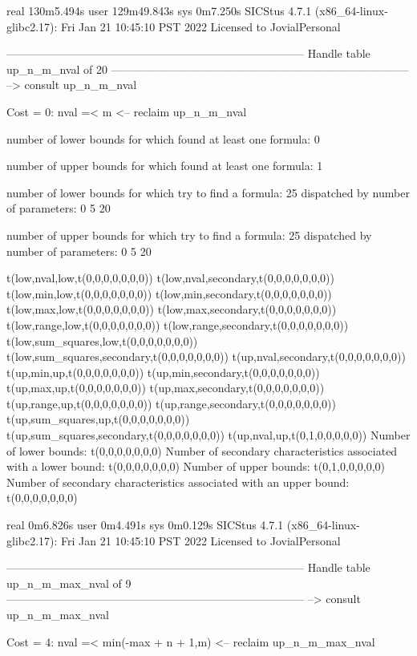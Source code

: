 real	130m5.494s
user	129m49.843s
sys	0m7.250s
SICStus 4.7.1 (x86_64-linux-glibc2.17): Fri Jan 21 10:45:10 PST 2022
Licensed to JovialPersonal


--------------------------------------------------------------------------------
Handle table up_n_m_nval of 20
--------------------------------------------------------------------------------
--> consult up_n_m_nval

Cost =  0:  nval =< m
<-- reclaim up_n_m_nval

number of lower bounds for which found at least one formula: 0

number of upper bounds for which found at least one formula: 1

number of lower bounds for which try to find a formula: 25
dispatched by number of parameters: 0  5  20

number of upper bounds for which try to find a formula: 25
dispatched by number of parameters: 0  5  20

t(low,nval,low,t(0,0,0,0,0,0,0))
t(low,nval,secondary,t(0,0,0,0,0,0,0))
t(low,min,low,t(0,0,0,0,0,0,0))
t(low,min,secondary,t(0,0,0,0,0,0,0))
t(low,max,low,t(0,0,0,0,0,0,0))
t(low,max,secondary,t(0,0,0,0,0,0,0))
t(low,range,low,t(0,0,0,0,0,0,0))
t(low,range,secondary,t(0,0,0,0,0,0,0))
t(low,sum_squares,low,t(0,0,0,0,0,0,0))
t(low,sum_squares,secondary,t(0,0,0,0,0,0,0))
t(up,nval,secondary,t(0,0,0,0,0,0,0))
t(up,min,up,t(0,0,0,0,0,0,0))
t(up,min,secondary,t(0,0,0,0,0,0,0))
t(up,max,up,t(0,0,0,0,0,0,0))
t(up,max,secondary,t(0,0,0,0,0,0,0))
t(up,range,up,t(0,0,0,0,0,0,0))
t(up,range,secondary,t(0,0,0,0,0,0,0))
t(up,sum_squares,up,t(0,0,0,0,0,0,0))
t(up,sum_squares,secondary,t(0,0,0,0,0,0,0))
t(up,nval,up,t(0,1,0,0,0,0,0))
Number of lower bounds:                                             t(0,0,0,0,0,0,0)
Number of secondary characteristics associated with a lower bound:  t(0,0,0,0,0,0,0)
Number of upper bounds:                                             t(0,1,0,0,0,0,0)
Number of secondary characteristics associated with an upper bound: t(0,0,0,0,0,0,0)

real	0m6.826s
user	0m4.491s
sys	0m0.129s
SICStus 4.7.1 (x86_64-linux-glibc2.17): Fri Jan 21 10:45:10 PST 2022
Licensed to JovialPersonal


--------------------------------------------------------------------------------
Handle table up_n_m_max_nval of 9
--------------------------------------------------------------------------------
--> consult up_n_m_max_nval

Cost =  4:  nval =< min(-max + n + 1,m)
<-- reclaim up_n_m_max_nval

